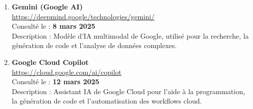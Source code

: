 \begin{enumerate}
    \item \textbf{Gemini (Google AI)} \\
    \url{https://deepmind.google/technologies/gemini/} \\
    Consulté le : \textbf{8 mars 2025} \\
    Description : Modèle d’IA multimodal de Google, utilisé pour la recherche, la génération de code et l’analyse de données complexes.

    \item \textbf{Google Cloud Copilot} \\
    \url{https://cloud.google.com/ai/copilot} \\
    Consulté le : \textbf{12 mars 2025} \\
    Description : Assistant IA de Google Cloud pour l’aide à la programmation, la génération de code et l’automatisation des workflows cloud.
\end{enumerate}
